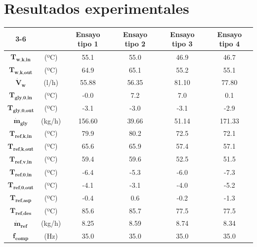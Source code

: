 \documentclass[../main.tex]{subfiles}
\begin{document}
\newpage

\section{Resultados experimentales}

\label{sec:resultados_experimentales}

\begin{table}[ht]
\centering
\begin{tabular}{cc|c|c|c|c|}
\cline{3-6}
 & & \textbf{Ensayo tipo 1} & \textbf{Ensayo tipo 2} & \textbf{Ensayo tipo 3} & \textbf{Ensayo tipo 4} \\
\hline
\multicolumn{1}{|c}{$\textbf{T}_\textbf{w,k,in}$} & (ºC) & 55.1 & 55.0 & 46.9 & 46.7 \\
\hline
\multicolumn{1}{|c}{$\textbf{T}_\textbf{w,k,out}$} & (ºC) & 64.9 & 65.1 & 55.2 & 55.1 \\
\hline
\multicolumn{1}{|c}{$\dot{\textbf{V}}_\textbf{w}$} & (l/h) & 55.88 & 56.35 & 81.10 & 77.80 \\
\hline
\multicolumn{1}{|c}{$\textbf{T}_\textbf{gly,0,in}$} & (ºC) & -0.0 & 7.2 & 7.0 & 0.1 \\
\hline
\multicolumn{1}{|c}{$\textbf{T}_\textbf{gly,0,out}$} & (ºC) & -3.1 & -3.0 & -3.1 & -2.9 \\
\hline
\multicolumn{1}{|c}{$\dot{\textbf{m}}_\textbf{gly}$} & (kg/h) & 156.60 & 39.66 & 51.14 & 171.33 \\
\hline
\multicolumn{1}{|c}{$\textbf{T}_\textbf{ref,k,in}$} & (ºC) & 79.9 & 80.2 & 72.5 & 72.1 \\
\hline
\multicolumn{1}{|c}{$\textbf{T}_\textbf{ref,k,out}$} & (ºC) & 65.6 & 65.9 & 57.4 & 57.1 \\
\hline
\multicolumn{1}{|c}{$\textbf{T}_\textbf{ref,v,in}$} & (ºC) & 59.4 & 59.6 & 52.5 & 51.5 \\
\hline
\multicolumn{1}{|c}{$\textbf{T}_\textbf{ref,0,in}$} & (ºC) & -6.4 & -5.3 & -6.0 & -7.3 \\
\hline
\multicolumn{1}{|c}{$\textbf{T}_\textbf{ref,0,out}$} & (ºC) & -4.1 & -3.1 & -4.0 & -5.2 \\
\hline
\multicolumn{1}{|c}{$\textbf{T}_\textbf{ref,asp}$} & (ºC) & -0.4 & 0.6 & -0.2 & -1.3 \\
\hline
\multicolumn{1}{|c}{$\textbf{T}_\textbf{ref,des}$} & (ºC) & 85.6 & 85.7 & 77.5 & 77.5 \\
\hline
\multicolumn{1}{|c}{$\dot{\textbf{m}}_\textbf{ref}$} & (kg/h) & 8.25 & 8.59 & 8.74 & 8.34 \\
\hline
\multicolumn{1}{|c}{$\textbf{f}_\textbf{comp}$} & (Hz) & 35.0 & 35.0 & 35.0 & 35.0 \\

\end{tabular}
\end{table}
\end{document}
